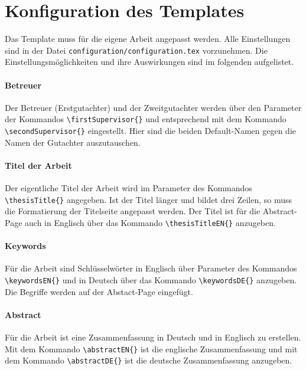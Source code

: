 %
\section{Konfiguration des Templates}\label{sec:configuraitions}
Das Template muss für die eigene Arbeit angepasst werden. Alle Einstellungen sind in der Datei \texttt{configuration/configuration.tex} vorzunehmen. Die Einstellungsmöglichkeiten und ihre Auswirkungen sind im folgenden aufgelistet.

\paragraph{Betreuer} Der Betreuer (Erstgutachter) und der Zweitgutachter werden über den Parameter der Kommandos \texttt{\textbackslash firstSupervisor\{\}} und entsprechend mit dem Kommando \texttt{\textbackslash secondSupervisor\{\}} eingestellt. Hier sind die beiden Default-Namen gegen die Namen der Gutachter auszutauschen.

\paragraph{Titel der Arbeit} Der eigentliche Titel der Arbeit wird im Parameter des Kommandos \texttt{\textbackslash thesisTitle\{\}} angegeben. Ist der Titel länger und bildet drei Zeilen, so muss die Formatierung der Titelseite angepasst werden. Der Titel ist für die Abstract-Page auch in Englisch über das Kommando \texttt{\textbackslash thesisTitleEN\{\}} anzugeben.

\paragraph{Keywords} Für die Arbeit sind Schlüsselwörter in Englisch über Parameter des Kommandos \texttt{\textbackslash keywordsEN\{\}} und in Deutsch über das Kommando \texttt{\textbackslash keywordsDE\{\}} anzugeben. Die Begriffe werden auf der Abstact-Page eingefügt.

\paragraph{Abstract} Für die Arbeit ist eine Zusammenfassung in Deutsch und in Englisch zu erstellen. Mit dem Kommando \texttt{\textbackslash abstractEN\{\}} ist die englische Zusammenfassung und mit dem Kommando \texttt{\textbackslash abstractDE\{\}} ist die
deutsche Zusammenfassung anzugeben.

